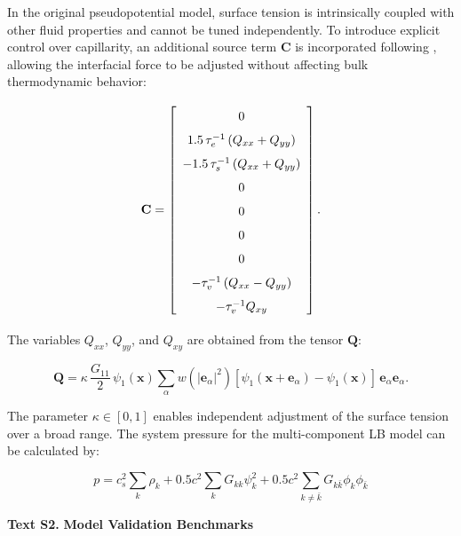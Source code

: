 \documentclass[draft,wrr]{agutexSI2019}
\begin{document}
\begin{article}
In the original pseudopotential model, surface tension is intrinsically coupled
with other fluid properties and cannot be tuned independently. To introduce
explicit control over capillarity, an additional source term $\mathbf{C}$ is
incorporated following , allowing the interfacial force
to be adjusted without affecting bulk thermodynamic behavior:
\begin{linenomath*}
\begin{equation}
\label{eq:surface_tension_source}
\mathbf{C}
=
\left[
\renewcommand{\arraystretch}{1.6}
\begin{array}{c}
\makebox[3cm]{0} \\
1.5\,\tau_e^{-1}\left(Q_{xx}+Q_{yy}\right) \\
-1.5\,\tau_s^{-1}\left(Q_{xx}+Q_{yy}\right) \\
0 \\
0 \\
0 \\
0 \\
-\tau_v^{-1}\left(Q_{xx}-Q_{yy}\right) \\
-\tau_v^{-1} Q_{xy}
\end{array}
\right] .
\end{equation}
\end{linenomath*}
The variables $Q_{xx}$, $Q_{yy}$, and $Q_{xy}$ are obtained from the tensor
$\mathbf{Q}$:
\begin{linenomath*}
\begin{equation}
\label{eq:Q_tensor}
\mathbf{Q}
=
\kappa
\,
\frac{G_{11}}{2}
\,
\psi_1(\mathbf{x})
\sum_{\alpha}
w\!\left(|\mathbf{e}_{\alpha}|^2\right)
\left[
\psi_1(\mathbf{x}+\mathbf{e}_{\alpha})
-
\psi_1(\mathbf{x})
\right]
\,
\mathbf{e}_{\alpha}\mathbf{e}_{\alpha} .
\end{equation}
\end{linenomath*}
The parameter $\kappa \in [0,1]$ enables independent adjustment of the surface
tension over a broad range.
The system pressure for the multi-component LB model can be calculated by:
\begin{linenomath*}
\begin{equation}
\label{eq:system-pressure}
p = c_{s}^{2} \sum_{k} \rho_{k} + 0.5 c^{2} \sum_{k} G_{kk}
\psi_{k}^{2} + 0.5 c^{2} \sum_{k \neq \bar{k}} G_{k\bar{k}} \phi_k \phi_{\bar{k}}
\end{equation}
\end{linenomath*}
\noindent\textbf{Text S2.}
\textbf{Model Validation Benchmarks}


\end{article}
\end{document}
